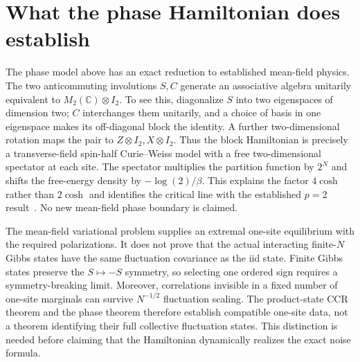 \section{What the phase Hamiltonian does establish}
The phase model above has an exact reduction to established mean-field physics.
The two anticommuting involutions $S,C$ generate an associative algebra unitarily equivalent to $M_2(\mathbb C)\otimes I_2$.
To see this, diagonalize $S$ into two eigenspaces of dimension two; $C$ interchanges them unitarily, and a choice of basis in one eigenspace makes its off-diagonal block the identity.
A further two-dimensional rotation maps the pair to $Z\otimes I_2,X\otimes I_2$.
Thus the block Hamiltonian is precisely a transverse-field spin-half Curie--Weiss model with a free two-dimensional spectator at each site.
The spectator multiplies the partition function by $2^N$ and shifts the free-energy density by $-\log(2)/\beta$.
This explains the factor $4\cosh$ rather than $2\cosh$ and identifies the critical line with the established $p=2$ result~\cite{Bapst2012}.
No new mean-field phase boundary is claimed.

The mean-field variational problem supplies an extremal one-site equilibrium with the required polarizations.
It does not prove that the actual interacting finite-$N$ Gibbs states have the same fluctuation covariance as the iid state.
Finite Gibbs states preserve the $S\mapsto-S$ symmetry, so selecting one ordered sign requires a symmetry-breaking limit.
Moreover, correlations invisible in a fixed number of one-site marginals can survive $N^{-1/2}$ fluctuation scaling.
The product-state CCR theorem and the phase theorem therefore establish compatible one-site data, not a theorem identifying their full collective fluctuation states.
This distinction is needed before claiming that the Hamiltonian dynamically realizes the exact noise formula.
